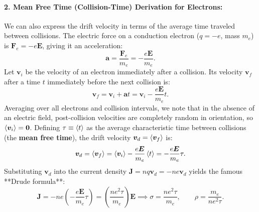 \paragraph{2. Mean Free Time (Collision-Time) Derivation for Electrons:}
We can also express the drift velocity in terms of the average time traveled between collisions. The electric force on a conduction electron ($q = -e$, mass $m_e$) is $\bm{F}_e = -e\bm{E}$, giving it an acceleration:
\begin{equation}
    \bm{a} = \frac{\bm{F}_e}{m_e} = -\frac{e\bm{E}}{m_e}.
\end{equation}
Let $\bm{v}_i$ be the velocity of an electron immediately after a collision. Its velocity $\bm{v}_f$ after a time $t$ immediately before the next collision is:
\begin{equation}
    \bm{v}_f = \bm{v}_i + \bm{a} t = \bm{v}_i - \frac{e\bm{E}}{m_e} t.
\end{equation}
Averaging over all electrons and collision intervals, we note that in the absence of an electric field, post-collision velocities are completely random in orientation, so $\ev{\bm{v}_i} = \bm{0}$. Defining $\tau \equiv \ev{t}$ as the average characteristic time between collisions (the \textbf{mean free time}), the drift velocity $\bm{v}_d = \ev{\bm{v}_f}$ is:
\begin{equation}
    \bm{v}_d = \ev{\bm{v}_f} = \ev{\bm{v}_i} - \frac{e\bm{E}}{m_e} \ev{t} = -\frac{e\bm{E}}{m_e} \tau.
\end{equation}
Substituting $\bm{v}_d$ into the current density $\bm{J} = n q \bm{v}_d = -n e \bm{v}_d$ yields the famous **Drude formula**:
\begin{equation}
    \bm{J} = -n e \left( -\frac{e\bm{E}}{m_e} \tau \right) = \left( \frac{n e^2 \tau}{m_e} \right) \bm{E} \implies \boxed{\sigma = \frac{n e^2 \tau}{m_e}, \qquad \rho = \frac{m_e}{n e^2 \tau}.}
\end{equation}

